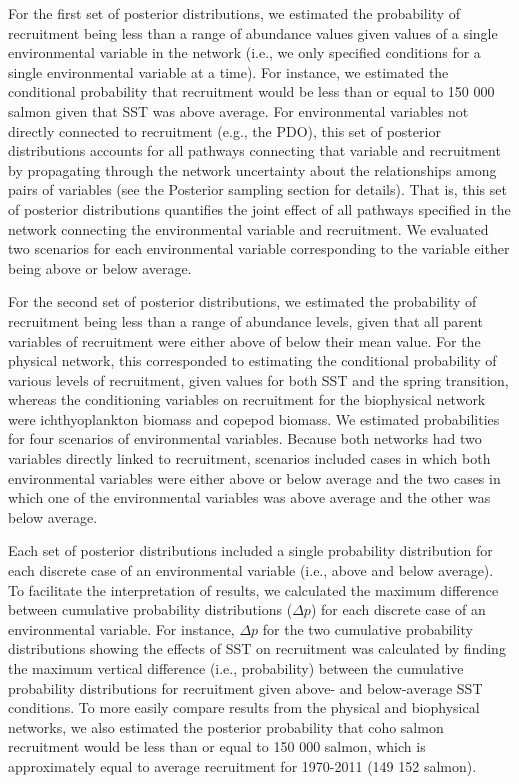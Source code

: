 For the first set of posterior distributions, we estimated the probability of
recruitment being less than a range of abundance values given values of a single
environmental variable in the network (i.e., we only specified conditions for a
single environmental variable at a time). For instance, we estimated the
conditional probability that recruitment would be less than or equal to 150 000
salmon given that SST was above average. For environmental variables not
directly connected to recruitment (e.g., the PDO), this set of posterior
distributions accounts for all pathways connecting that variable and recruitment
by propagating through the network uncertainty about the relationships among
pairs of variables (see the Posterior sampling section for details). That is,
this set of posterior distributions quantifies the joint effect of all pathways
specified in the network connecting the environmental variable and recruitment.
We evaluated two scenarios for each environmental variable corresponding to the
variable either being above or below average.

For the second set of posterior distributions, we estimated the probability of
recruitment being less than a range of abundance levels, given that all parent
variables of recruitment were either above of below their mean value. For the
physical network, this corresponded to estimating the conditional probability of
various levels of recruitment, given values for both SST and the spring
transition, whereas the conditioning variables on recruitment for the
biophysical network were ichthyoplankton biomass and copepod biomass. We
estimated probabilities for four scenarios of environmental variables. Because
both networks had two variables directly linked to recruitment, scenarios
included cases in which both environmental variables were either above or below
average and the two cases in which one of the environmental variables was above
average and the other was below average.

Each set of posterior distributions included a single probability distribution
for each discrete case of an environmental variable (i.e., above and below
average). To facilitate the interpretation of results, we calculated the maximum
difference between cumulative probability distributions (\(\Delta p\)) for each
discrete case of an environmental variable. For instance, \(\Delta p\) for the
two cumulative probability distributions showing the effects of SST on
recruitment was calculated by finding the maximum vertical difference (i.e.,
probability) between the cumulative probability distributions for recruitment
given above- and below-average SST conditions. To more easily compare results
from the physical and biophysical networks, we also estimated the posterior
probability that coho salmon recruitment would be less than or equal to 150 000
salmon, which is approximately equal to average recruitment for 1970-2011 (149
152 salmon).


